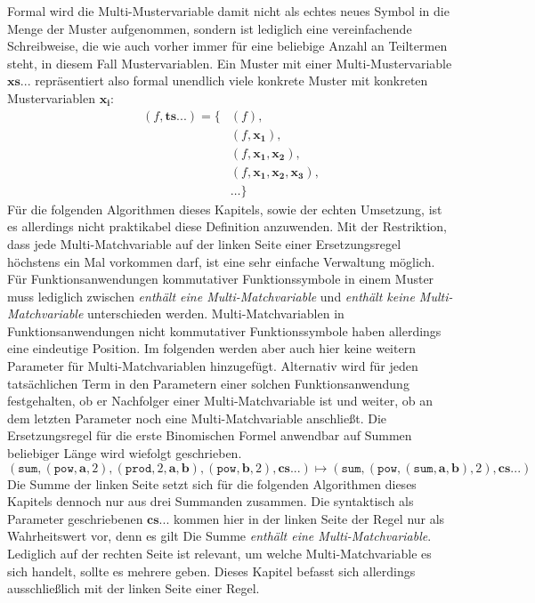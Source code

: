 Formal wird die Multi-Mustervariable damit nicht als echtes neues Symbol in die Menge der Muster aufgenommen, sondern ist lediglich eine vereinfachende Schreibweise, die wie auch vorher immer für eine beliebige Anzahl an Teiltermen steht, in diesem Fall Mustervariablen. Ein Muster mit einer Multi-Mustervariable $\mathbf{xs...}$ repräsentiert also formal unendlich viele konkrete Muster mit konkreten Mustervariablen $\mathbf{x_i}$:
\begin{equation*}
    \begin{split}
    		(f, \mathbf{ts...}) = \{&(f), \\
    		&(f, \mathbf{x_1}),\\
    		&(f, \mathbf{x_1}, \mathbf{x_2}), \\
    		&(f, \mathbf{x_1}, \mathbf{x_2}, \mathbf{x_3}), \\
    		&\dots \}    		
    \end{split}
\end{equation*}
Für die folgenden Algorithmen dieses Kapitels, sowie der echten Umsetzung, ist es allerdings nicht praktikabel diese Definition anzuwenden. Mit der Restriktion, dass jede Multi-Matchvariable auf der linken Seite einer Ersetzungsregel höchstens ein Mal vorkommen darf, ist eine sehr einfache Verwaltung möglich. Für Funktionsanwendungen kommutativer Funktionssymbole in einem Muster muss lediglich zwischen \emph{enthält eine Multi-Matchvariable} und \emph{enthält keine Multi-Matchvariable} unterschieden werden. Multi-Matchvariablen in Funktionsanwendungen nicht kommutativer Funktionssymbole haben allerdings eine eindeutige Position. Im folgenden werden aber auch hier keine weitern Parameter für Multi-Matchvariablen hinzugefügt. Alternativ wird für jeden tatsächlichen Term in den Parametern einer solchen Funktionsanwendung festgehalten, ob er Nachfolger einer Multi-Matchvariable ist und weiter, ob an dem letzten Parameter noch eine Multi-Matchvariable anschließt. 
Die Ersetzungsregel für die erste Binomischen Formel anwendbar auf Summen beliebiger Länge wird wiefolgt geschrieben.
$$(\texttt{sum}, (\texttt{pow}, \mathbf a, 2), (\texttt{prod}, 2, \mathbf a, \mathbf b), (\texttt{pow}, \mathbf b, 2), \mathbf{cs...}) \mapsto (\texttt{sum}, (\texttt{pow}, (\texttt{sum}, \mathbf a, \mathbf b), 2), \mathbf{cs...})$$
Die Summe der linken Seite setzt sich für die folgenden Algorithmen dieses Kapitels dennoch nur aus drei Summanden zusammen. Die syntaktisch als Parameter geschriebenen $\mathbf{cs...}$ kommen hier in der linken Seite der Regel nur als Wahrheitswert vor, denn es gilt \glqq Die Summe \emph{enthält eine Multi-Matchvariable}\grqq{}. Lediglich auf der rechten Seite ist relevant, um welche Multi-Matchvariable es sich handelt, sollte es mehrere geben. Dieses Kapitel befasst sich allerdings ausschließlich mit der linken Seite einer Regel.



